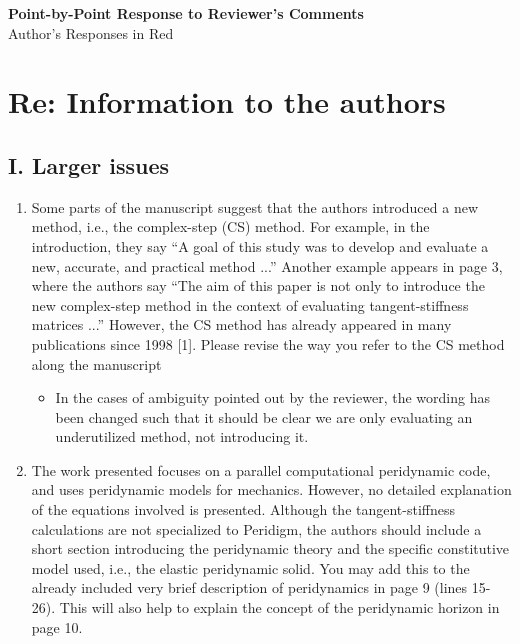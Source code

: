\documentclass{article}
\begin{document}
\begin{center}
    {\LARGE \bf Point-by-Point Response to Reviewer's Comments} \\
     Author's Responses in {\color{red} Red}
\end{center}

\section*{Re: Information to the authors}
%
\subsection*{I. Larger issues}
%
\begin{enumerate}
    \item
         Some parts of the manuscript suggest that the authors introduced a new method, i.e., the complex-step (CS) method. For example, in the introduction, they say ``A goal of this study was to develop and evaluate a new, accurate, and practical method ...'' Another example appears in page 3, where the authors say ``The aim of this paper is not only to introduce the new complex-step method in the context of evaluating tangent-stiffness matrices ...'' However, the CS method has already appeared in many publications since 1998 [1]. Please revise the way you refer to the CS method along the manuscript

{\color{red}
  \begin{itemize}
      \item In the cases of ambiguity pointed out by the reviewer, the wording has been changed such that it should be clear we are only evaluating an underutilized method, not introducing it.
  \end{itemize}
}
    \item
        The work presented focuses on a parallel computational peridynamic code, and
        uses peridynamic models for mechanics. However, no detailed explanation of the
        equations involved is presented. Although the tangent-stiffness calculations are
        not specialized to Peridigm, the authors should include a short section introducing
        the peridynamic theory and the specific constitutive model used, i.e., the elastic
        peridynamic solid. You may add this to the already included very brief description
        of peridynamics in page 9 (lines 15-26). This will also help to explain the concept
        of the peridynamic horizon in page 10.


\end{enumerate}
\end{document}
